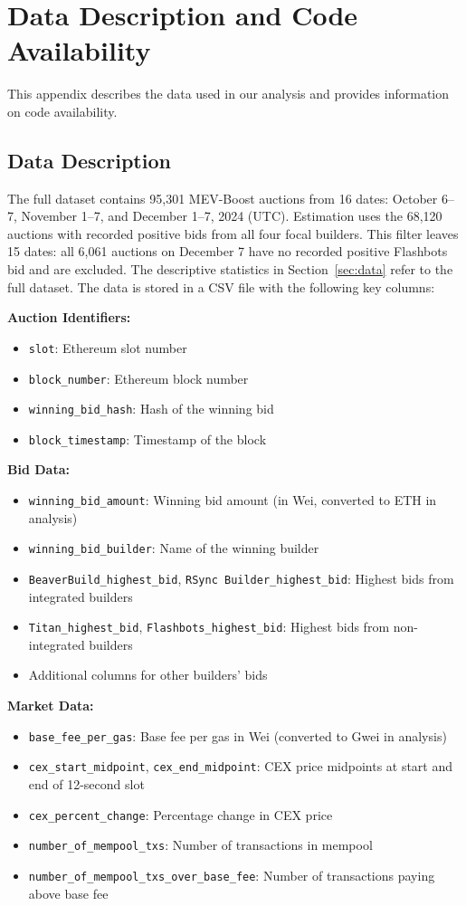 \documentclass[12pt,reqno]{amsart}
\begin{document}
\section{Data Description and Code Availability}
\label{app:data}

This appendix describes the data used in our analysis and provides information on code availability.

\subsection{Data Description}

The full dataset contains 95,301 MEV-Boost auctions from 16 dates: October 6--7, November 1--7, and December 1--7, 2024 (UTC). Estimation uses the 68,120 auctions with recorded positive bids from all four focal builders. This filter leaves 15 dates: all 6,061 auctions on December 7 have no recorded positive Flashbots bid and are excluded. The descriptive statistics in Section~\ref{sec:data} refer to the full dataset. The data is stored in a CSV file with the following key columns:

\textbf{Auction Identifiers:}
\begin{itemize}
\item \texttt{slot}: Ethereum slot number
\item \texttt{block\_number}: Ethereum block number
\item \texttt{winning\_bid\_hash}: Hash of the winning bid
\item \texttt{block\_timestamp}: Timestamp of the block
\end{itemize}

\textbf{Bid Data:}
\begin{itemize}
\item \texttt{winning\_bid\_amount}: Winning bid amount (in Wei, converted to ETH in analysis)
\item \texttt{winning\_bid\_builder}: Name of the winning builder
\item \texttt{BeaverBuild\_highest\_bid}, \texttt{RSync Builder\_highest\_bid}: Highest bids from integrated builders
\item \texttt{Titan\_highest\_bid}, \texttt{Flashbots\_highest\_bid}: Highest bids from non-integrated builders
\item Additional columns for other builders' bids
\end{itemize}

\textbf{Market Data:}
\begin{itemize}
\item \texttt{base\_fee\_per\_gas}: Base fee per gas in Wei (converted to Gwei in analysis)
\item \texttt{cex\_start\_midpoint}, \texttt{cex\_end\_midpoint}: CEX price midpoints at start and end of 12-second slot
\item \texttt{cex\_percent\_change}: Percentage change in CEX price
\item \texttt{number\_of\_mempool\_txs}: Number of transactions in mempool
\item \texttt{number\_of\_mempool\_txs\_over\_base\_fee}: Number of transactions paying above base fee
\end{itemize}
\end{document}
